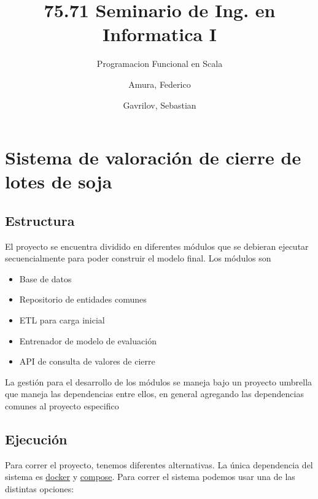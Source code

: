 \documentclass[10pt,spanish,a4paper,]{article}
\title{75.71 Seminario de Ing. en Informatica I}
\subtitle{Programacion Funcional en Scala}
\author{Amura, Federico \and Gavrilov, Sebastian}
\date{}
\providecommand{\tightlist}{%
  \setlength{\itemsep}{0pt}\setlength{\parskip}{0pt}}
\begin{document}
\maketitle

{
\setcounter{tocdepth}{3}
\tableofcontents
}
\newpage

\hypertarget{sistema-de-valoraciuxf3n-de-cierre-de-lotes-de-soja}{%
\section{Sistema de valoración de cierre de lotes de
soja}\label{sistema-de-valoraciuxf3n-de-cierre-de-lotes-de-soja}}

\hypertarget{estructura}{%
\subsection{Estructura}\label{estructura}}

El proyecto se encuentra dividido en diferentes módulos que se debieran
ejecutar secuencialmente para poder construir el modelo final. Los
módulos son

\begin{itemize}
\tightlist
\item
  Base de datos
\item
  Repositorio de entidades comunes
\item
  ETL para carga inicial
\item
  Entrenador de modelo de evaluación
\item
  API de consulta de valores de cierre
\end{itemize}

La gestión para el desarrollo de los módulos se maneja bajo un proyecto
umbrella que maneja las dependencias entre ellos, en general agregando
las dependencias comunes al proyecto especifico

\hypertarget{ejecuciuxf3n}{%
\subsection{Ejecución}\label{ejecuciuxf3n}}

Para correr el proyecto, tenemos diferentes alternativas. La única
dependencia del sistema es \href{https://docs.docker.com/}{docker} y
\href{https://docs.docker.com/compose/install/}{compose}. Para correr el
sistema podemos usar una de las distintas opciones:
\end{document}
